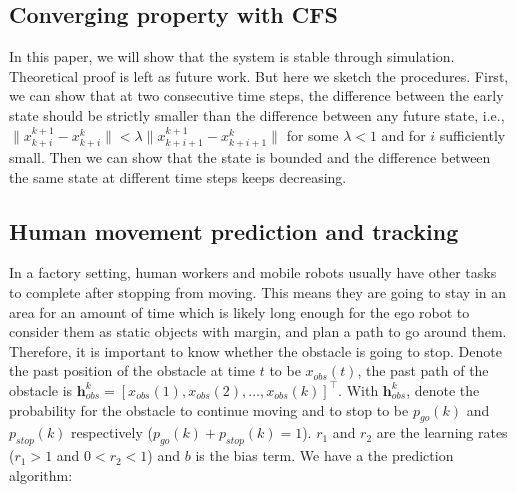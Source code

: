 \documentclass[letterpaper, 10 pt, conference]{ieeeconf}  %
\begin{document}
\subsection{Converging property with CFS}
In this paper, we will show that the system is stable through simulation. Theoretical proof is left as future work. But here we sketch the procedures. First, we can show that at two consecutive time steps, the difference between the early state should be strictly smaller than the difference between any future state, i.e., $\|x_{k+i}^{k+1}-x_{k+i}^k\|<\lambda\|x_{k+i+1}^{k+1}-x_{k+i+1}^k\|$ for some $\lambda<1$ and for $i$ sufficiently small. Then we can show that the state is bounded and the difference between the same state at different time steps keeps decreasing.
%
%

\subsection{Human movement prediction and tracking}
In a factory setting, human workers and mobile robots usually have other tasks to complete after stopping from moving. This means they are going to stay in an area for an amount of time which is likely long enough for the ego robot to consider them as static objects with margin, and plan a path to go around them. Therefore, it is important to know whether the obstacle is going to stop. Denote the past position of the obstacle at time $t$ to be $x_{obs}(t)$, the past path of the obstacle is $\mathbf{h}_{obs}^k = [x_{obs}(1), x_{obs}(2),\ldots, x_{obs}(k)]^\top$. With $\mathbf{h}_{obs}^k$, denote the probability for the obstacle to continue moving and to stop to be $p_{go}(k)$ and $p_{stop}(k)$ respectively ($p_{go}(k)+p_{stop}(k)=1$). $r_1$ and $r_2$ are the learning rates ($r_1 >1 $ and $0<r_2<1$) and $b$ is the bias term. We have a the prediction algorithm: 
\end{document}
